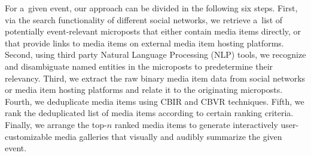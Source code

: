 \begin{abstracts}
For a~given event, our approach can be divided in the following six steps.
First, via the search functionality of different social networks,
we retrieve a~list of potentially event-relevant microposts
that either contain media items directly,
or that provide links to media items on external media item hosting platforms.
Second, using third party Natural Language Processing (NLP) tools,
we recognize and disambiguate named entities in the microposts to predetermine their relevancy.
Third, we extract the raw binary media item data from social networks or media item hosting platforms
and relate it to the originating microposts.
Fourth, we deduplicate media items using CBIR and CBVR techniques.
Fifth, we rank the deduplicated list of media items according to certain ranking criteria.
Finally, we arrange the top-$n$ ranked media items to generate
interactively user-customizable media galleries that visually and audibly summarize the given event.
\end{abstracts}

